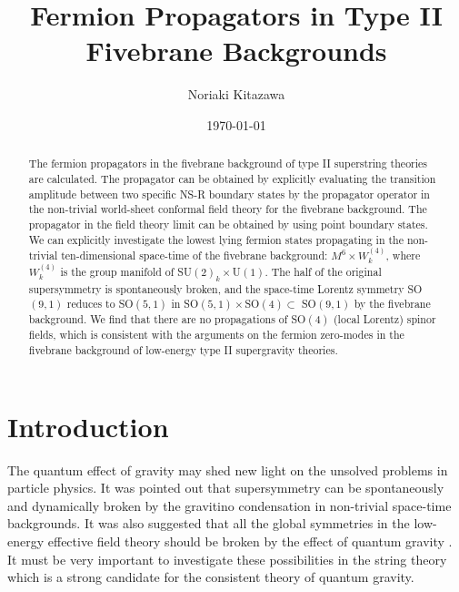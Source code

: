 \documentclass[a4paper,prd,preprint]{revtex4}
\begin{document}
\title{Fermion Propagators in Type II Fivebrane Backgrounds}

\author{Noriaki Kitazawa}

\date{\today}

\begin{abstract}
The fermion propagators in the fivebrane background
 of type II superstring theories are calculated.
The propagator can be obtained
 by explicitly evaluating the transition amplitude
 between two specific NS-R boundary states by the propagator operator
 in the non-trivial world-sheet conformal field theory
 for the fivebrane background.
The propagator in the field theory limit
 can be obtained by using point boundary states.
We can explicitly investigate
 the lowest lying fermion states
 propagating in the non-trivial ten-dimensional space-time
 of the fivebrane background:
 $M^6 \times W_k^{(4)}$,
 where $W_k^{(4)}$ is the group manifold of SU$(2)_k \times$U$(1)$.
The half of the original supersymmetry is spontaneously broken,
 and the space-time Lorentz symmetry SO$(9,1)$ reduces to
 SO$(5,1)$ in SO$(5,1) \times$SO$(4) \subset$ SO$(9,1)$
 by the fivebrane background.
We find that there are no propagations
 of SO$(4)$ (local Lorentz) spinor fields,
 which is consistent with the arguments
 on the fermion zero-modes in the fivebrane background
 of low-energy type II supergravity theories.
\end{abstract}

\pacs{}
\preprint{}

\vspace*{3cm}

\maketitle

\section{Introduction}
\label{sec:intro}

The quantum effect of gravity
 may shed new light on the unsolved problems in particle physics.
It was pointed out that
 supersymmetry can be spontaneously and dynamically broken
 by the gravitino condensation\cite{Witten,KMP}
 in non-trivial space-time backgrounds.
It was also suggested that
 all the global symmetries in the low-energy effective field theory
 should be broken by the effect of quantum gravity
 \cite{Giddings-Strominger,Coleman}.
It must be very important
 to investigate these possibilities in the string theory
 which is a strong candidate for the consistent theory
 of quantum gravity.
\end{document}
